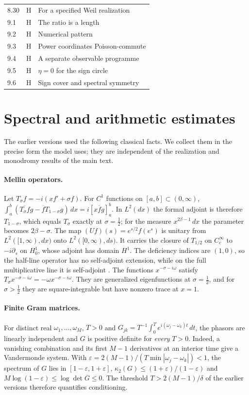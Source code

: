 \documentclass[11pt]{article}
\theoremstyle{definition}\newtheorem{definition}[theorem]{Definition}
\theoremstyle{remark}\newtheorem{remark}[theorem]{Remark}
\newcommand{\dd}{\,d}\newcommand{\norm}[1]{\left\lVert#1\right\rVert}
\begin{document}
{\begin{longtable}{@{}l>{\raggedright\arraybackslash}p{.06\linewidth}>{\raggedright\arraybackslash}p{.72\linewidth}@{}}
8.30 & H & For a specified Weil realization\\
9.1 & H & The ratio is a length\\
9.2 & H & Numerical pattern\\
9.3 & H & Power coordinates Poisson-commute\\
9.4 & H & A separate observable programme\\
9.5 & H & $\eta=0$ for the sign circle\\
9.6 & H & Sign cover and spectral symmetry\\\bottomrule
\end{longtable}}

\section{Spectral and arithmetic estimates}\label{sec:spectral}
The earlier versions used the following classical facts. We collect them in
the precise form the model uses; they are independent of the realization and
monodromy results of the main text.

\paragraph{Mellin operators.} Let $T_\sigma f=-i(xf'+\sigma f)$. For $C^1$
functions on $[a,b]\subset(0,\infty)$,
$\int_a^b(\overline{T_\sigma f}g-\overline fT_{1-\sigma}g)\dd x=i[x\overline fg]_a^b$.
In $L^2(dx)$ the formal adjoint is therefore $T_{1-\sigma}$, which equals
$T_\sigma$ exactly at $\sigma=\frac12$; for the measure $x^{2\beta-1}\dd x$ the
parameter becomes $2\beta-\sigma$. The map $(Uf)(s)=e^{s/2}f(e^s)$ is unitary from
$L^2([1,\infty),dx)$ onto $L^2([0,\infty),ds)$. It carries the closure of
$T_{1/2}$ on $C_c^\infty$ to $-i\partial_s$ on $H^1_0$, whose adjoint has domain
$H^1$. The deficiency indices are $(1,0)$, so the half-line operator has no
self-adjoint extension, while on the full multiplicative line it is
self-adjoint \cite{reed}. The functions $x^{-\sigma-i\omega}$ satisfy
$T_\sigma x^{-\sigma-i\omega}=-\omega x^{-\sigma-i\omega}$. They are generalized
eigenfunctions at $\sigma=\frac12$, and for $\sigma>\frac12$ they are square-integrable
but have nonzero trace at $x=1$.

\paragraph{Finite Gram matrices.} For distinct real $\omega_1,\dots,\omega_M$,
$T>0$ and $G_{jk}=T^{-1}\int_0^Te^{i(\omega_j-\omega_k)t}\dd t$, the phasors are
linearly independent and $G$ is positive definite for \emph{every} $T>0$. Indeed,
a vanishing combination and its first $M-1$ derivatives at an interior time give
a Vandermonde system. With $\varepsilon=2(M-1)/(T\min|\omega_j-\omega_k|)<1$, the
spectrum of $G$ lies in $[1-\varepsilon,1+\varepsilon]$,
$\kappa_2(G)\leq(1+\varepsilon)/(1-\varepsilon)$ and
$M\log(1-\varepsilon)\leq\log\det G\leq0$. The threshold $T>2(M-1)/\delta$ of the
earlier versions therefore quantifies conditioning.
\end{document}
